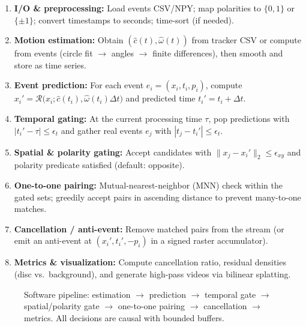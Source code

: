 \begin{enumerate}
  \item \textbf{I/O \& preprocessing:} Load events CSV/NPY; map polarities to $\{0,1\}$ or $\{\pm 1\}$; convert timestamps to seconds; time-sort (if needed).
  \item \textbf{Motion estimation:} Obtain $(\hat c(t),\hat\omega(t))$ from tracker CSV or compute from events (circle fit $\rightarrow$ angles $\rightarrow$ finite differences), then smooth and store as time series.
  \item \textbf{Event prediction:} For each event $e_i=(x_i,t_i,p_i)$, compute $x_i' = \mathcal{R}\!\big(x_i; \hat c(t_i), \hat\omega(t_i)\Delta t\big)$ and predicted time $t_i' = t_i+\Delta t$.
  \item \textbf{Temporal gating:} At the current processing time $\tau$, pop predictions with $|t_i' - \tau| \le \epsilon_t$ and gather real events $e_j$ with $|t_j - t_i'| \le \epsilon_t$.
  \item \textbf{Spatial \& polarity gating:} Accept candidates with $\|x_j - x_i'\|_2 \le \epsilon_{xy}$ and polarity predicate satisfied (default: opposite).
  \item \textbf{One-to-one pairing:} Mutual-nearest-neighbor (MNN) check within the gated sets; greedily accept pairs in ascending distance to prevent many-to-one matches.
  \item \textbf{Cancellation / anti-event:} Remove matched pairs from the stream (or emit an anti-event at $(x_i',t_i',-p_i)$ in a signed raster accumulator).
  \item \textbf{Metrics \& visualization:} Compute cancellation ratio, residual densities (disc vs.\ background), and generate high-pass videos via bilinear splatting.
\end{enumerate}

\begin{figure}[t]
  \centering
  \caption{Software pipeline: estimation $\rightarrow$ prediction $\rightarrow$ temporal gate $\rightarrow$ spatial/polarity gate $\rightarrow$ one-to-one pairing $\rightarrow$ cancellation $\rightarrow$ metrics. All decisions are causal with bounded buffers.}
  \label{fig:pipeline}
\end{figure}

